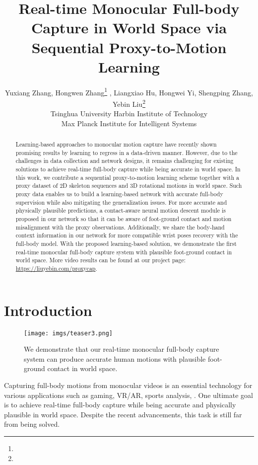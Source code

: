 \documentclass[10pt,twocolumn,letterpaper]{article}
\title{Real-time Monocular Full-body Capture in World Space via Sequential Proxy-to-Motion Learning}
\author{Yuxiang Zhang, Hongwen Zhang\footnote[1]{} , Liangxiao Hu, Hongwei Yi, Shengping Zhang, Yebin Liu\footnote[1]{}\\
 Tsinghua University \quad
 Harbin Institute of Technology \\
 Max Planck Institute for Intelligent Systems
}
\begin{document}
\maketitle
{}
\begin{abstract}
Learning-based approaches to monocular motion capture have recently shown promising results by learning to regress in a data-driven manner. However, due to the challenges in data collection and network designs, it remains challenging for existing solutions to achieve real-time full-body capture while being accurate in world space. In this work, we contribute a sequential proxy-to-motion learning scheme together with a proxy dataset of 2D skeleton sequences and 3D rotational motions in world space. Such proxy data enables us to build a learning-based network with accurate full-body supervision while also mitigating the generalization issues. For more accurate and physically plausible predictions, a contact-aware neural motion descent module is proposed in our network so that it can be aware of foot-ground contact and motion misalignment with the proxy observations. Additionally, we share the body-hand context information in our network for more compatible wrist poses recovery with the full-body model. With the proposed learning-based solution, we demonstrate the first real-time monocular full-body capture system with plausible foot-ground contact in world space. More video results can be found at our project page: \href{https://liuyebin.com/proxycap}{https://liuyebin.com/proxycap}.

\end{abstract}
 \section{Introduction}
\begin{figure}[ht!]
    \centering
    \texttt{[image: imgs/teaser3.png]}
    \caption{We demonstrate that our real-time monocular full-body capture system can produce accurate human motions with plausible foot-ground contact in world space. }
    \vspace{-2mm}
    \label{fig:descent_compare}
\end{figure}
Capturing full-body motions from monocular videos is an essential technology for various applications such as gaming, VR/AR, sports analysis, \etc.
One ultimate goal is to achieve real-time full-body capture while being accurate and physically plausible in world space.
Despite the recent advancements, this task is still far from being solved.
\end{document}
